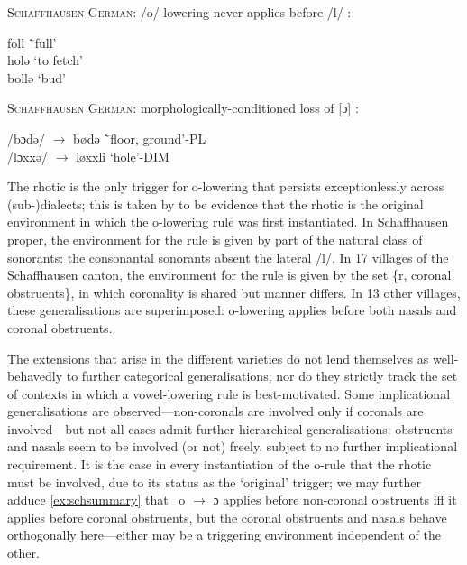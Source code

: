 \begin{example}\label{ex:schlateral} \textsc{Schaffhausen German}: /o/-lowering never applies before /l/ \citep{Keel1982}:
\begin{tabbing}
        foll \tab[3cm] \= `full' \\
        holə  \> `to fetch' \\
        bollə \> `bud'
    \end{tabbing}
\end{example}

\begin{example}\label{ex:schmorph} \textsc{Schaffhausen German}: morphologically-conditioned loss of [ɔ] \citep{Garrett2014}:
\begin{tabbing}
        /bɔdə/ $\rightarrow$ bødə \tab[3cm] \=`floor, ground'-{\sc\scriptsize PL} \\
        /lɔxxə/ $\rightarrow$ løxxli \>`hole'-{\sc\scriptsize DIM}
    \end{tabbing}
\end{example}

The rhotic is the only trigger for o-lowering that persists exceptionlessly across (sub-)dialects; this is taken by \cite{Keel1982,JandaJoseph2003,Mielke2008} to be evidence that the rhotic is the original environment in which the o-lowering rule was first instantiated. In Schaffhausen proper, the environment for the rule is given by part of the natural class of sonorants: the consonantal sonorants absent the lateral /l/. In 17 villages of the Schaffhausen canton, the environment for the rule is given by the set \{r, coronal obstruents\}, in which coronality is shared but manner differs. In 13 other villages, these generalisations are superimposed: o-lowering applies before both nasals and coronal obstruents.

The extensions that arise in the different varieties do not lend themselves as well-behavedly to further categorical generalisations; nor do they strictly track the set of contexts in which a vowel-lowering rule is best-motivated. Some implicational generalisations are observed---non-coronals are involved only if coronals are involved---but not all cases admit further hierarchical generalisations: obstruents and nasals seem to be involved (or not) freely, subject to no further implicational requirement. It is the case in every instantiation of the o-rule that the rhotic must be involved, due to its status as the `original' trigger; we may further adduce \cref{ex:schsummary} that \ o $\rightarrow$ ɔ applies before non-coronal obstruents iff it applies before coronal obstruents, but the coronal obstruents and nasals behave orthogonally here---either may be a triggering environment independent of the other.

